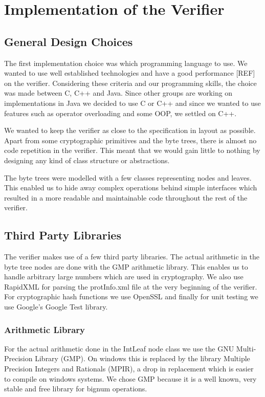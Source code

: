 \section{Implementation of the Verifier}

\subsection{General Design Choices}

The first implementation choice was which programming language to use. We wanted to use well established technologies and have a good performance [REF] on the verifier. Considering these criteria and our programming skills, the choice was made between C, C++ and Java. Since other groups are working on implementations in Java we decided to use C or C++ and since we wanted to use features such as operator overloading and some OOP, we settled on C++.

We wanted to keep the verifier as close to the specification in layout as possible. Apart from some cryptographic primitives and the byte trees, there is almost no code repetition in the verifier. This meant that we would gain little to nothing by designing any kind of class structure or abstractions.

The byte trees were modelled with a few classes representing nodes and leaves. This enabled us to hide away complex operations behind simple interfaces which resulted in a more readable and maintainable code throughout the rest of the verifier.

\subsection{Third Party Libraries}

The verifier makes use of a few third party libraries. The actual arithmetic in the byte tree nodes are done with the GMP arithmetic library. This enables us to handle arbitrary large numbers which are used in cryptography. We also use RapidXML for parsing the protInfo.xml file at the very beginning of the verifier. For cryptographic hash functions we use OpenSSL and finally for unit testing we use Google's Google Test library.

\subsubsection{Arithmetic Library}

For the actual arithmetic done in the IntLeaf node class we use the GNU Multi-Precision Library (GMP). On windows this is replaced by the library Multiple Precision Integers and Rationals (MPIR), a drop in replacement which is easier to compile on windows systems. We chose GMP because it is a well known, very stable and free library for bignum operations.

